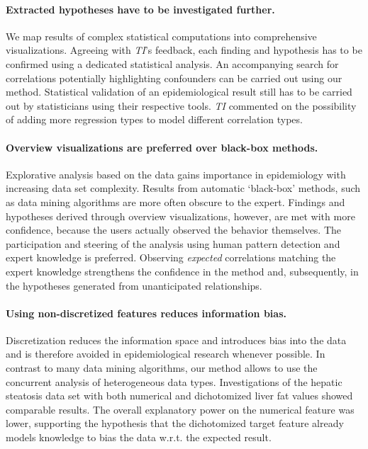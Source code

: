 \documentclass[journal]{style/vgtc} 			          %
\begin{document}
\paragraph{Extracted hypotheses have to be investigated further.}
We map results of complex statistical computations into comprehensive visualizations.
Agreeing with \emph{TI}'s feedback, each finding and hypothesis has to be confirmed using a dedicated statistical analysis.
An accompanying search for correlations potentially highlighting confounders can be carried out using our method.
Statistical validation of an epidemiological result still has to be carried out by statisticians using their respective tools.
\emph{TI} commented on the possibility of adding more regression types to model different correlation types.%

\paragraph{Overview visualizations are preferred over black-box methods.}
Explorative analysis based on the data gains importance in epidemiology with increasing data set complexity.
Results from automatic `black-box' methods, such as data mining algorithms are more often obscure to the expert.
Findings and hypotheses derived through overview visualizations, however, are met with more confidence, because the users actually observed the behavior themselves.
The participation and steering of the analysis using human pattern detection and expert knowledge is preferred.
Observing \emph{expected} correlations matching the expert knowledge strengthens the confidence in the method and, subsequently, in the hypotheses generated from unanticipated relationships.

\paragraph{Using non-discretized features reduces information bias.}
Discretization reduces the information space and introduces bias into the data and is therefore avoided in epidemiological research whenever possible.
In contrast to many data mining algorithms, our method allows to use the concurrent analysis of heterogeneous data types.
Investigations of the hepatic steatosis data set with both numerical and dichotomized liver fat values showed comparable results. %
The overall explanatory power on the numerical feature was lower, supporting the hypothesis that the dichotomized target feature already models knowledge to bias the data w.r.t. the expected result.
\end{document}
